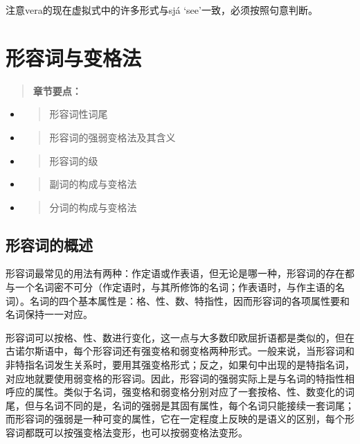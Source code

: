 注意vera的现在虚拟式中的许多形式与sjá `see‌'一致，必须按照句意判断。

\section{形容词与变格法}\label{ux5f62ux5bb9ux8bcdux4e0eux53d8ux683cux6cd5}

\begin{quote}
\textbf{章节要点：}
\end{quote}

\begin{itemize}
\item
  \begin{quote}
  形容词性词尾
  \end{quote}
\item
  \begin{quote}
  形容词的强弱变格法及其含义
  \end{quote}
\item
  \begin{quote}
  形容词的级
  \end{quote}
\item
  \begin{quote}
  副词的构成与变格法
  \end{quote}
\item
  \begin{quote}
  分词的构成与变格法
  \end{quote}
\end{itemize}

\subsection{形容词的概述}\label{ux5f62ux5bb9ux8bcdux7684ux6982ux8ff0}

形容词最常见的用法有两种：作定语或作表语，但无论是哪一种，形容词的存在都与一个名词密不可分（作定语时，与其所修饰的名词；作表语时，与作主语的名词）。名词的四个基本属性是：格、性、数、特指性，因而形容词的各项属性要和名词保持一一对应。

形容词可以按格、性、数进行变化，这一点与大多数印欧屈折语都是类似的，但在古诺尔斯语中，每个形容词还有强变格和弱变格两种形式。一般来说，当形容词和非特指名词发生关系时，要用其强变格形式；反之，如果句中出现的是特指名词，对应地就要使用弱变格的形容词。因此，形容词的强弱实际上是与名词的特指性相呼应的属性。类似于名词，强变格和弱变格分别对应了一套按格、性、数变化的词尾，但与名词不同的是，名词的强弱是其固有属性，每个名词只能接续一套词尾；而形容词的强弱是一种可变的属性，它在一定程度上反映的是语义的区别，每个形容词都既可以按强变格法变形，也可以按弱变格法变形。

